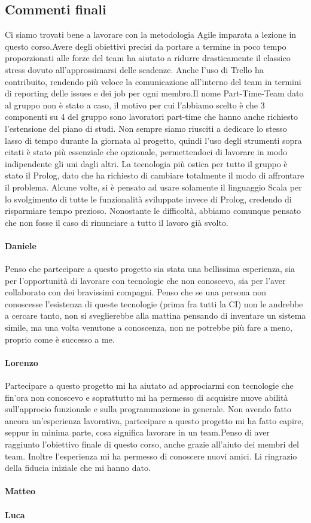 \subsection{Commenti finali}
Ci siamo trovati bene a lavorare con la metodologia Agile imparata a lezione in questo corso.Avere degli obiettivi precisi da portare a termine in poco tempo proporzionati alle forze del team ha aiutato a ridurre drasticamente il classico stress dovuto all’approssimarsi delle scadenze. \newline \newline Anche l’uso di Trello ha contribuito, rendendo più veloce la comunicazione all’interno del team in termini di reporting delle issues e dei job per ogni membro.\newline \newline Il nome Part-Time-Team dato al gruppo non è stato a caso, il motivo per cui l’abbiamo scelto è che 3 componenti su 4 del gruppo sono lavoratori part-time che hanno anche richiesto l’estensione del piano di studi. Non sempre siamo riusciti a dedicare lo stesso lasso di tempo durante la giornata al progetto, quindi l’uso degli strumenti sopra citati è stato più essenziale che opzionale, permettendoci di lavorare in modo indipendente gli uni dagli altri. \newline \newline La tecnologia più ostica per tutto il gruppo è stato il Prolog, dato che ha richiesto di cambiare totalmente il modo di affrontare il problema. Alcune volte, si è pensato ad usare solamente il linguaggio Scala per lo svolgimento di tutte le funzionalità sviluppate invece di Prolog, credendo di risparmiare tempo prezioso. Nonostante le difficoltà, abbiamo comunque pensato che non fosse il caso di rinunciare a tutto il lavoro già svolto.
\paragraph{Daniele}
Penso che partecipare a questo progetto sia stata una bellissima esperienza, sia per l’opportunità di lavorare con tecnologie che non conoscevo, sia per l’aver collaborato con dei bravissimi compagni. Penso che se una persona non conoscesse l’esistenza di queste tecnologie (prima fra tutti la CI) non le andrebbe a cercare tanto, non si sveglierebbe alla mattina pensando di inventare un sistema simile, ma una volta venutone a conoscenza, non ne potrebbe più fare a meno, proprio come è successo a me.
\paragraph{Lorenzo}
Partecipare a questo progetto mi ha aiutato ad approciarmi con tecnologie che fin'ora non conoscevo e soprattutto mi ha permesso di acquisire nuove abilità sull'approcio funzionale e sulla programmazione in generale. Non avendo fatto ancora un'esperienza lavorativa, partecipare a questo progetto mi ha fatto capire, seppur in minima parte, cosa significa lavorare in un team.\newline Penso di aver raggiunto l'obiettivo finale di questo corso, anche grazie all'aiuto dei membri del team. Inoltre l'esperienza mi ha permesso di conoscere nuovi amici. Li ringrazio della fiducia iniziale che mi hanno dato.
\paragraph{Matteo}
\paragraph{Luca}